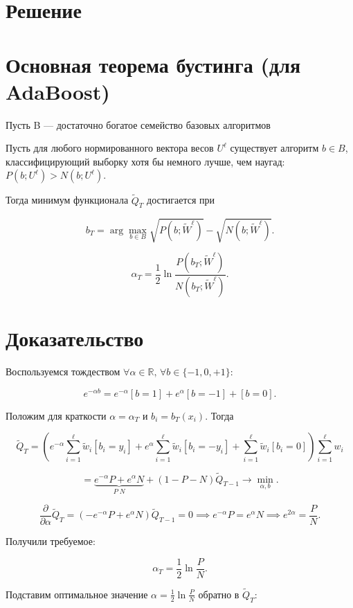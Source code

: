 \section*{Решение}
\section*{Основная теорема бустинга (для AdaBoost)}
Пусть B — достаточно богатое семейство базовых алгоритмов

Пусть для любого нормированного вектора весов \(U^\ell\) существует алгоритм \(b \in B\), классифицирующий выборку хотя бы немного лучше, чем наугад: \(P(b; U^\ell) > N(b; U^\ell)\).

Тогда минимум функционала \(\widetilde{Q}_T\) достигается при

\[
b_T = \arg \max_{b \in B} \sqrt{P(b; \widetilde{W}^\ell)} - \sqrt{N(b; \widetilde{W}^\ell)}.
\]

\[
\alpha_T = \frac{1}{2} \ln \frac{P(b_T; \widetilde{W}^\ell)}{N(b_T; \widetilde{W}^\ell)}.
\]

\section*{Доказательство}

Воспользуемся тождеством \(\forall \alpha \in \mathbb{R}, \, \forall b \in \{-1, 0, +1\}\):

\[
e^{-\alpha b} = e^{-\alpha}[b = 1] + e^{\alpha}[b = -1] + [b = 0].
\]

Положим для краткости \(\alpha = \alpha_T\) и \(b_i = b_T(x_i)\). Тогда

\[
\widetilde{Q}_T = \left(e^{-\alpha} \sum_{i=1}^\ell \widetilde{w}_i[b_i = y_i] + e^{\alpha} \sum_{i=1}^\ell \widetilde{w}_i[b_i = -y_i] + \sum_{i=1}^\ell \widetilde{w}_i[b_i = 0]\right) \sum_{i=1}^\ell w_i
\]

\[
= \underbrace{e^{-\alpha} P + e^{\alpha} N}_{P \; N} + (1 - P - N) \widetilde{Q}_{T-1} \rightarrow \min_{\alpha, b}.
\]

\[
\frac{\partial}{\partial \alpha} \widetilde{Q}_T = (-e^{-\alpha} P + e^{\alpha} N) \widetilde{Q}_{T-1} = 0 \implies e^{-\alpha} P = e^{\alpha} N \implies e^{2\alpha} = \frac{P}{N}.
\]

Получили требуемое:

\[
\alpha_T = \frac{1}{2} \ln \frac{P}{N}.
\]

Подставим оптимальное значение \(\alpha = \frac{1}{2} \ln \frac{P}{N}\) обратно в \(\widetilde{Q}_T\):

